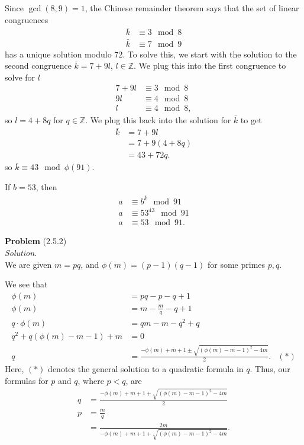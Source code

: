 \documentclass[12 pt]{amsart}
\begin{document}
  Since $\gcd(8, 9) = 1$, the Chinese remainder theorem says that the
  set of linear congruences
  \begin{align*}
    \bar{k} &\equiv 3 \mod 8 \\
    \bar{k} &\equiv 7 \mod 9 
  \end{align*}
  has a unique solution modulo 72. 
  To solve this, we start with the solution to the second congruence
  $\bar{k} = 7 + 9l$, $l \in \mathbb{Z}$.
  We plug this into the first congruence to solve for $l$
  \begin{align*}
    7 + 9l &\equiv 3 \mod 8 \\
     9l &\equiv 4 \mod 8 \\
     l &\equiv 4 \mod 8,
  \end{align*}
  so $l = 4 + 8q$ for $q \in \mathbb{Z}$. 
  We plug this back into the solution for $\bar{k}$ to get
  \begin{align*}
    \bar{k} &= 7 + 9l \\
      &= 7 + 9(4 + 8q) \\
      &= 43 + 72q.
  \end{align*}
  so $\bar{k} \equiv 43 \mod \phi(91)$.

  If $b = 53$, then
  \begin{align*}
    a &\equiv b^{\bar{k}} \mod 91 \\
    a &\equiv 53^{43} \mod 91 \\
    a &\equiv 53 \mod 91.
  \end{align*}
\vfill
\newpage



\phantom{\quad} \vfill
\noindent
\textbf{Problem} (2.5.2) \\[4ex]
\emph{Solution.} \\[2ex]
  We are given $m = pq$, and 
  $\phi(m) = (p - 1)(q - 1)$ for some primes
  $p, q$.

  We see that
  \begin{align*}
    \phi(m) &= pq - p - q + 1 \\
    \phi(m) &= m - \frac{m}{q} - q + 1 \\
    q \cdot \phi(m) &= qm - m - q^2 + q \\
    q^2 + q(\phi(m) - m - 1) + m &= 0 \\
    q &= \frac{-\phi(m) + m + 1 \pm \sqrt{(\phi(m) - m - 1)^2 - 4m}}{2}. & (*)
  \end{align*}
  Here, $(*)$ denotes the general solution to a quadratic formula in $q$.
  Thus, our formulas for $p$ and $q$, where $p < q$, are
  \begin{align*}
    q &= \frac{-\phi(m) + m + 1 + \sqrt{(\phi(m) - m - 1)^2 - 4m}}{2} \\
    p &= \frac{m}{q} \\
      &= \frac{2m}{-\phi(m) + m + 1 + \sqrt{(\phi(m) - m - 1)^2 - 4m}}. 
  \end{align*}
\end{document}
